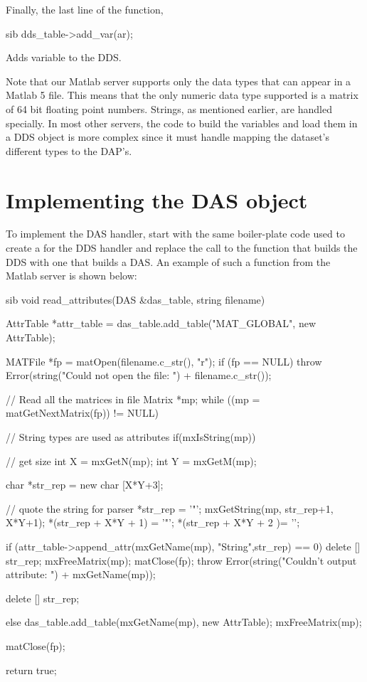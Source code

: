 \documentclass{dods-paper}
\begin{document}
Finally, the last line of the function,

\begin{vcode}{sib}
    dds_table->add_var(ar);
\end{vcode}

Adds variable  to the DDS.

Note that our Matlab server supports only the data types that can appear
in a Matlab 5 file. This means that the only numeric data type supported
is a matrix of 64 bit floating point numbers. Strings, as mentioned earlier,
are handled specially. In most other servers, the code to build the variables
and load them in a DDS object is more complex since it must handle mapping
the dataset's different types to the DAP's.

\section{Implementing the DAS object}

To implement the DAS handler, start with the same boiler-plate code
used to create a  for the DDS handler and replace the call
to the function that builds the DDS with one that builds a DAS. An
example of such a function from the Matlab server is shown below:

\begin{vcode}{sib}
void
read_attributes(DAS &das_table, string filename)
{
    AttrTable *attr_table = das_table.add_table("MAT_GLOBAL", new AttrTable);
    
    MATFile *fp = matOpen(filename.c_str(), "r");
    if (fp == NULL)
        throw Error(string("Could not open the file: ") + filename.c_str());

    // Read all the matrices in file
    Matrix *mp;
    while ((mp = matGetNextMatrix(fp)) != NULL) {
        // String types are used as attributes
        if(mxIsString(mp)) {
            // get size
            int X = mxGetN(mp);
            int Y = mxGetM(mp);

            char *str_rep = new char [X*Y+3];
      
            // quote the string for parser
            *str_rep = '"'; 
            mxGetString(mp, str_rep+1, X*Y+1);
            *(str_rep + X*Y + 1) = '"';
            *(str_rep + X*Y + 2 )= '\0';

            if (attr_table->append_attr(mxGetName(mp),
                "String",str_rep) == 0) {
                delete [] str_rep;
                mxFreeMatrix(mp);
                matClose(fp);
                throw Error(string("Couldn't output attribute: ")
                            + mxGetName(mp));
            }

            delete [] str_rep;
        }
        else {
            das_table.add_table(mxGetName(mp), new AttrTable);
        }
        mxFreeMatrix(mp);
    }
    matClose(fp);

    return true;
}
\end{vcode}
  
\end{document}
